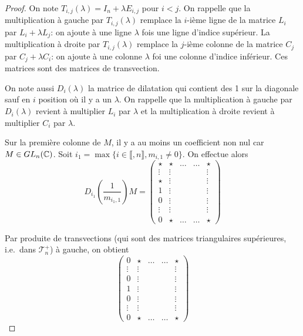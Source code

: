 \documentclass[12pt]{article}
\begin{document}
\begin{proof}
    On note $T_{i,j}(\lambda)=I_{n}+\lambda E_{i,j}$ pour $i<j$. On rappelle que la multiplication à gauche par $T_{i,j}(\lambda)$ remplace la $i$-ième ligne de la matrice $L_{i}$ par $L_{i}+\lambda L_{j}$: on ajoute à une ligne $\lambda$ fois une ligne d'indice supérieur.
    La multiplication à droite par $T_{i,j}(\lambda)$ remplace la $j$-ième colonne de la matrice $C_{j}$ par $C_{j}+\lambda C_{i}$: on ajoute à une colonne $\lambda$ foi une colonne d'indice inférieur. Ces matrices sont des matrices de transvection.

    On note aussi $D_{i}(\lambda)$ la matrice de dilatation qui contient des 1 sur la diagonale sauf en $i$ position où il y a un $\lambda$. On rappelle que la multiplication à gauche par $D_{i}(\lambda)$ revient à multiplier $L_{i}$ par $\lambda$ et la multiplication à droite revient à multiplier $C_{i}$ par $\lambda$.

    Sur la première colonne de $M$, il y a au moins un coefficient non nul car $M\in GL_{n}(\mathbb{C})$. Soit $i_{1}=\max\lbrace i\in\llbracket,n\rrbracket,m_{i,1}\neq0\rbrace$. On effectue alors 
    \begin{equation}
        D_{i_{1}}\left(\frac{1}{m_{i_{1},1}}\right)M=
        \begin{pmatrix}
            \star & \star & \dots & \dots & \star\\
            \vdots & \vdots & & &\vdots\\
            \star & \vdots & & & \vdots\\
            1 & \vdots & & & \vdots\\
            0 & \vdots & & &\vdots\\
            \vdots & \vdots & & & \vdots\\
            0 & \star & \dots & \dots & \star
        \end{pmatrix}
    \end{equation}

    Par produite de transvections (qui sont des matrices triangulaires supérieures, i.e.~dans $\mathcal{T}_{n}^{+}$) à gauche, on obtient 
    \begin{equation}
        \begin{pmatrix}
            0 & \star & \dots & \dots & \star\\
            \vdots & \vdots & & &\vdots\\
            0 & \vdots & & & \vdots\\
            1 & \vdots & & & \vdots\\
            0 & \vdots & & &\vdots\\
            \vdots & \vdots & & & \vdots\\
            0 & \star & \dots & \dots & \star
        \end{pmatrix}
    \end{equation}


\end{proof}
\end{document}

